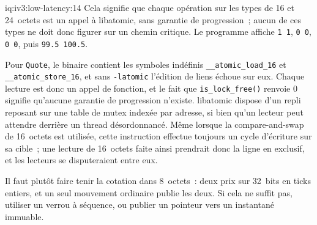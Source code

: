 \begin{solution}{iq:iv3:low-latency:14}
Cela signifie que chaque opération sur les types de 16 et 24~octets est un appel à libatomic, sans garantie de progression~; aucun de ces types ne doit donc figurer sur un chemin critique. Le programme affiche \texttt{1 1}, \texttt{0 0}, \texttt{0 0}, puis \texttt{99.5 100.5}.

Pour \texttt{Quote}, le binaire contient les symboles indéfinis \texttt{\_\_atomic\_load\_16} et \texttt{\_\_atomic\_store\_16}, et sans \texttt{-latomic} l'édition de liens échoue sur eux. Chaque lecture est donc un appel de fonction, et le fait que \texttt{is\_lock\_free()} renvoie 0 signifie qu'aucune garantie de progression n'existe. libatomic dispose d'un repli reposant sur une table de mutex indexée par adresse, si bien qu'un lecteur peut attendre derrière un thread désordonnancé. Même lorsque la compare-and-swap de 16~octets est utilisée, cette instruction effectue toujours un cycle d'écriture sur sa cible~; une lecture de 16~octets faite ainsi prendrait donc la ligne en exclusif, et les lecteurs se disputeraient entre eux.

Il faut plutôt faire tenir la cotation dans 8~octets~: deux prix sur 32~bits en ticks entiers, et un seul mouvement ordinaire publie les deux. Si cela ne suffit pas, utiliser un verrou à séquence, ou publier un pointeur vers un instantané immuable.

\end{solution}

